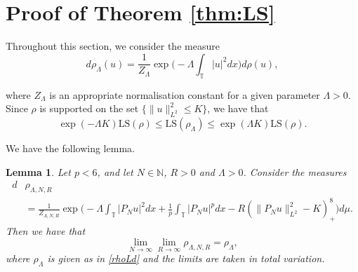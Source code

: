 \documentclass[letterpaper, 11pt,  reqno]{amsart}
\newtheorem{lemma}[theorem]{Lemma}
\theoremstyle{definition}
\newcommand{\1}{\mathbbm 1}
\newcommand{\noi}{\noindent}
\newcommand{\T}{\mathbb{T}}
\newcommand{\0}{\mathbf 0}
\newcommand{\norm}[1]{\left\|#1\right\|}
\newcommand{\E}{\mathbb{E}}
\def\norm#1{\|#1\|}
\newcommand{\Ld}{\Lambda}
\newcommand{\les}{\lesssim}
\newcommand{\jb}[1]
{\langle #1 \rangle}
\newcommand{\N}{\mathbb{N}}
\numberwithin{equation}{section}
\numberwithin{theorem}{section}
\begin{document}
 
\section{Proof of Theorem \ref{thm:LS}}
\label{SEC:LS}
Throughout this section, we consider the measure 
\begin{equation}
    d\rho_{\Ld}(u) = \frac{1}{Z_\Ld} \exp\Big(- \Ld \int_\T |u|^2 dx\Big) d \rho(u), 
    \label{rhoLd}
\end{equation}
 
 
 
\noi
where $Z_\Ld$ is an appropriate normalisation constant for a given parameter $\Ld>0$.
Since $\rho$ is supported on the set $\{ \| u \|_{L^2}^2 \le K \}$, we have that 
\begin{equation} \label{LSequivalence}
   \exp(-\Ld K) \mathrm{LS}(\rho) \le  \mathrm{LS}(\rho_\Ld) \le \exp( \Ld K) \mathrm{LS}(\rho).
\end{equation}
 
 
\noi
We have the following lemma.
 
 
 
 
 
 
\begin{lemma} \label{NRconvergenceweak}
    Let $p < 6$, and let $N \in \N$, $R > 0$
    and $\Lambda>0$. Consider the measures 
    \begin{align*}
d  &\rho_{\Ld,N,R} \\
 &=
 \frac{1}{Z_{\Ld,N,R}} \exp\Big( - \Ld \int_\T |P_Nu|^2 dx + \frac 1p \int_\T |P_Nu|^p dx- R(\|P_Nu\|_{L^2}^2 - K)_+^8 \Big) d \mu. 
    \end{align*}
    Then we have that
    \begin{equation*}
        \lim_{N \to \infty} \lim_{R \to \infty} \rho_{\Ld, N, R} = \rho_\Ld,
    \end{equation*}
    where $\rho_\Ld$ is given as
    in \eqref{rhoLd} and the limits are taken in total variation.
\end{lemma}
 
\end{document}
